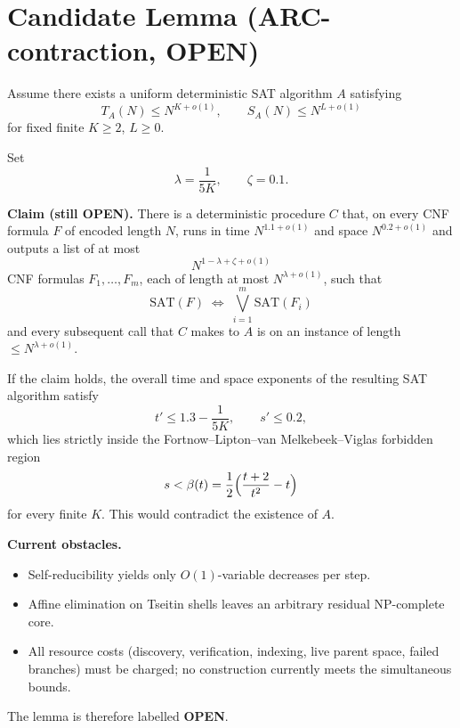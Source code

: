 
\section*{Candidate Lemma (ARC-contraction, OPEN)}

Assume there exists a uniform deterministic SAT algorithm \(A\) satisfying
\[
T_A(N)\le N^{K+o(1)},\qquad S_A(N)\le N^{L+o(1)}
\]
for fixed finite \(K\ge 2\), \(L\ge 0\).

Set
\[
\lambda=\frac1{5K},\qquad \zeta=0.1.
\]

\textbf{Claim (still OPEN).}
There is a deterministic procedure \(C\) that, on every CNF formula \(F\) of encoded length \(N\), runs in time \(N^{1.1+o(1)}\) and space \(N^{0.2+o(1)}\) and outputs a list of at most
\[
N^{1-\lambda+\zeta+o(1)}
\]
CNF formulas \(F_1,\dots,F_m\), each of length at most \(N^{\lambda+o(1)}\), such that
\[
\mathrm{SAT}(F)\;\iff\;\bigvee_{i=1}^m\mathrm{SAT}(F_i)
\]
and every subsequent call that \(C\) makes to \(A\) is on an instance of length \(\le N^{\lambda+o(1)}\).

If the claim holds, the overall time and space exponents of the resulting SAT algorithm satisfy
\[
t'\le 1.3-\frac1{5K},\qquad s'\le 0.2,
\]
which lies strictly inside the Fortnow–Lipton–van Melkebeek–Viglas forbidden region
\[
s<\beta(t)=\frac12\Bigl(\frac{t+2}{t^2}-t\Bigr)
\]
for every finite \(K\). This would contradict the existence of \(A\).

\textbf{Current obstacles.}
\begin{itemize}
\item Self-reducibility yields only \(O(1)\)-variable decreases per step.
\item Affine elimination on Tseitin shells leaves an arbitrary residual NP-complete core.
\item All resource costs (discovery, verification, indexing, live parent space, failed branches) must be charged; no construction currently meets the simultaneous bounds.
\end{itemize}

The lemma is therefore labelled \textbf{OPEN}.
